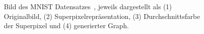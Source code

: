 \begin{figure}[t]
\centering
{}
  \caption[\gls{MNIST}]{Bild des \gls{MNIST} Datensatzes~\cite{mnist}, jeweils dargestellt als (1) Originalbild, (2) Superpixelrepräsentation, (3) Durchschnittsfarbe der Superpixel und (4) generierter Graph.}
\label{fig:mnist}
\end{figure}
